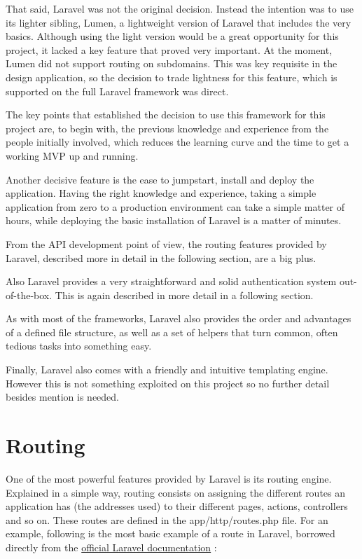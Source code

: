 That said, Laravel was not the original decision. Instead the intention was to use its lighter sibling, Lumen, a lightweight version of Laravel that includes the very basics. Although using the light version would be a great opportunity for this project, it lacked a key feature that proved very important. At the moment, Lumen did not support routing on subdomains. This was key requisite in the design application, so the decision to trade lightness for this feature, which is supported on the full Laravel framework was direct.

The key points that established the decision to use this framework for this project are, to begin with, the previous knowledge and experience from the people initially involved, which reduces the learning curve and the time to get a working MVP up and running.

Another decisive feature is the ease to jumpstart, install and deploy the application. Having the right knowledge and experience, taking a simple application from zero to a production environment can take a simple matter of hours, while deploying the basic installation of Laravel is a matter of minutes.

From the API development point of view, the routing features provided by Laravel, described more in detail in the following section, are a big plus.

Also Laravel provides a very straightforward and solid authentication system out-of-the-box. This is again described in more detail in a following section.

As with most of the frameworks, Laravel also provides the order and advantages of a defined file structure, as well as a set of helpers that turn common, often tedious tasks into something easy.

Finally, Laravel also comes with a friendly and intuitive templating engine. However this is not something exploited on this project so no further detail besides mention is needed.

\section{Routing}
One of the most powerful features provided by Laravel is its routing engine. Explained in a simple way, routing consists on assigning the different routes an application has (the addresses used) to their different pages, actions, controllers and so on. These routes are defined in the app/http/routes.php file. For an example, following is the most basic example of a route in Laravel, borrowed directly from the \href{https://laravel.com/docs/5.3/routing}{official Laravel documentation} \cite{10}:

